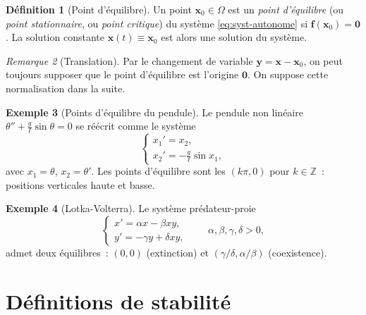 \documentclass[12pt,a4paper,openany]{book}
\theoremstyle{definition}
\newtheorem{definition}{Définition}[chapter]
\newtheorem{exemple}[definition]{Exemple}
\theoremstyle{plain}
\theoremstyle{remark}
\newtheorem{remarque}[definition]{Remarque}
\newcommand{\Z}{\mathbb{Z}}
\begin{document}
\begin{definition}[Point d'équilibre]\label{def:pt-equilibre}
  Un point $\mathbf{x}_0\in\Omega$ est un \emph{point d'équilibre}
  (ou \emph{point stationnaire}, ou \emph{point critique}) du système
  \eqref{eq:syst-autonome} si $\mathbf{f}(\mathbf{x}_0)=\mathbf{0}$.
  La solution constante $\mathbf{x}(t)\equiv\mathbf{x}_0$ est alors
  une solution du système.
\end{definition}

\begin{remarque}[Translation]\label{rem:translation-equilibre}
  Par le changement de variable $\mathbf{y}=\mathbf{x}-\mathbf{x}_0$,
  on peut toujours supposer que le point d'équilibre est l'origine
  $\mathbf{0}$. On suppose cette normalisation dans la suite.
\end{remarque}

\begin{exemple}[Points d'équilibre du pendule]\label{ex:equil-pendule}
  Le pendule non linéaire $\theta''+\frac{g}{\ell}\sin\theta=0$ se
  réécrit comme le système
  \[
    \begin{cases}
      x_1'=x_2, \\
      x_2'=-\frac{g}{\ell}\sin x_1,
    \end{cases}
  \]
  avec $x_1=\theta$, $x_2=\theta'$. Les points d'équilibre sont les
  $(k\pi,0)$ pour $k\in\Z$~: positions verticales haute et basse.
\end{exemple}

\begin{exemple}[Lotka-Volterra]\label{ex:equil-lotka}
  Le système prédateur-proie
  \[
    \begin{cases}
      x'=\alpha x-\beta xy, \\
      y'=-\gamma y+\delta xy,
    \end{cases}
    \qquad \alpha,\beta,\gamma,\delta>0,
  \]
  admet deux équilibres~: $(0,0)$ (extinction) et
  $(\gamma/\delta,\alpha/\beta)$ (coexistence).
\end{exemple}

\section{Définitions de stabilité}\label{sec:def-stabilite}
\end{document}
